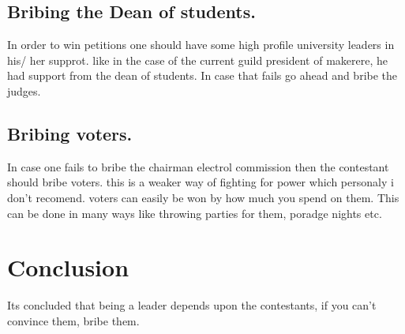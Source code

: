 \documentclass[options]{article}
\begin{document}
\subsection{Bribing the Dean of students.}
In order to win petitions one should have some high profile university leaders in his/ her supprot. like in the case of the current guild president of makerere, he had support from the dean of students.
In case that fails go ahead and bribe the judges.
\subsection{Bribing voters.}
In case one fails to bribe the chairman electrol commission then the contestant should bribe voters. this is a weaker way of fighting for power which personaly i don't recomend. voters can easily be won by how much you spend on them. This can be done in many ways like throwing parties for them, poradge nights etc.
\section{Conclusion}
Its concluded that being a leader depends upon the contestants, if you can't convince them, bribe them.
\end{document}
